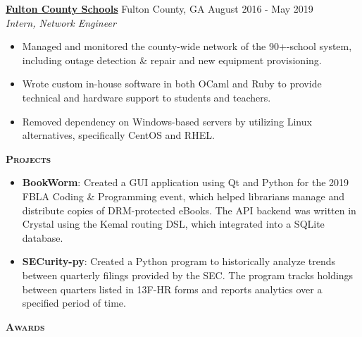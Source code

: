 \documentclass{article}
\newcommand{\sectionHeader}[1]{{\large \textbf{\textsc{#1}}}\hspace{5pt}\xrfill[.5ex]{.4pt}}
\begin{document}
  \vspace{5pt}

  \href{https://fultonschools.org}{\textbf{Fulton County Schools}} \hspace{3pt} {\footnotesize {}} Fulton County, GA \hspace*{\fill} {\footnotesize {}} \hspace{1pt} August 2016 - May 2019\\
  {\footnotesize {}} \hspace{1pt} \textit{Intern, Network Engineer}
  \begin{itemize}
    \item Managed and monitored the county-wide network of the 90+-school system, including outage detection \& repair and new equipment provisioning.
    \item Wrote custom in-house software in both OCaml and Ruby to provide technical and hardware support to students and teachers.
    \item Removed dependency on Windows-based servers by utilizing Linux alternatives, specifically CentOS and RHEL.
  \end{itemize}

  \vspace{8pt}

  \sectionHeader{Projects}

  \vspace{3pt}

  \begin{itemize}
\setmainfont[Scale=1.0,ItalicFont={IBM Plex Serif Italic}]{IBM Plex Serif}
    \item \textbf{BookWorm}: Created a GUI application using Qt and Python for the 2019 FBLA Coding \& Programming event, which helped librarians manage and distribute copies of DRM-protected eBooks. The API backend was written in Crystal using the Kemal routing DSL, which integrated into a SQLite database.
    \item \textbf{SECurity-py}: Created a Python program to historically analyze trends between quarterly filings provided by the SEC. The program tracks holdings between quarters listed in 13F-HR forms and reports analytics over a specified period of time.
  \end{itemize}

  \vspace{8pt}

  \sectionHeader{Awards}

  \vspace{3pt}
\end{document}

